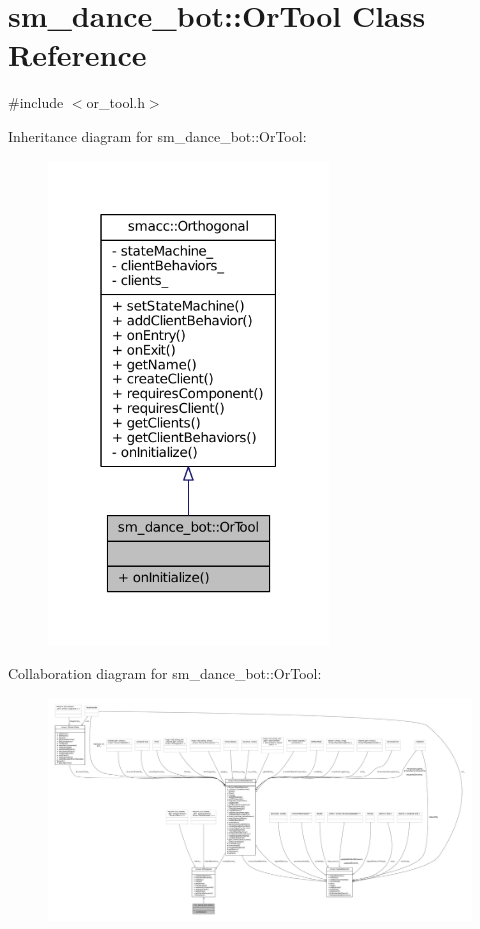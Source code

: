 \hypertarget{classsm__dance__bot_1_1OrTool}{}\section{sm\+\_\+dance\+\_\+bot\+:\+:Or\+Tool Class Reference}
\label{classsm__dance__bot_1_1OrTool}


{\ttfamily \#include $<$or\+\_\+tool.\+h$>$}



Inheritance diagram for sm\+\_\+dance\+\_\+bot\+:\+:Or\+Tool\+:
\nopagebreak
\begin{figure}[H]
\begin{center}
\leavevmode
\includegraphics[width=211pt]{classsm__dance__bot_1_1OrTool__inherit__graph}
\end{center}
\end{figure}


Collaboration diagram for sm\+\_\+dance\+\_\+bot\+:\+:Or\+Tool\+:
\nopagebreak
\begin{figure}[H]
\begin{center}
\leavevmode
\includegraphics[width=350pt]{classsm__dance__bot_1_1OrTool__coll__graph}
\end{center}
\end{figure}
